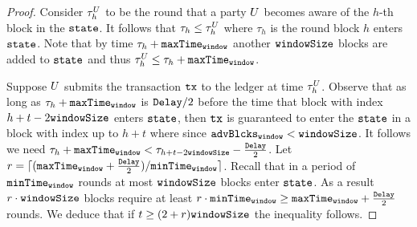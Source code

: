   \begin{proof}
    Consider $\tau^{U}_h$ to be the round that a party $U$  becomes
    aware of the $h$-th block in the $\texttt{state}$. It follows that $\tau_h \leq
    \tau^{U}_h$ where $\tau_h$ is the round block $h$ enters $\texttt{state}$. Note
    that by time $\tau_h + \texttt{maxTime}_\texttt{window}$ another $\texttt{windowSize}$ blocks are added to
    $\texttt{state}$ and thus $\tau^{U}_h \leq \tau_h + \texttt{maxTime}_\texttt{window}$.

    Suppose $U$ submits the transaction $\texttt{tx}$ to the ledger at time
    $\tau^{U}_h$. Observe that as long as $\tau_h + \texttt{maxTime}_\texttt{window}$ is $\texttt{Delay}/2$
    before the time that block with index $h + t - 2\texttt{windowSize}$ enters
    $\texttt{state}$, then $\texttt{tx}$ is guaranteed to enter the $\texttt{state}$ in a block with
    index up to $h + t$ where since $\texttt{advBlcks}_\texttt{window} < \texttt{windowSize}$. It
    follows we need $\tau_h + \texttt{maxTime}_\texttt{window} < \tau_{h + t - 2\texttt{windowSize}} -
    \frac{\texttt{Delay}}{2}$. Let $r = \lceil (\texttt{maxTime}_\texttt{window} + \frac{\texttt{Delay}}{2})/ \texttt{minTime}_\texttt{window}
    \rceil$. Recall that in a period of $\texttt{minTime}_\texttt{window}$ rounds at most $\texttt{windowSize}$
    blocks enter $\texttt{state}$. As a result $r \cdot \texttt{windowSize}$ blocks require at
    least $r \cdot \texttt{minTime}_\texttt{window} \geq \texttt{maxTime}_\texttt{window} + \frac{\texttt{Delay}}{2}$ rounds. We deduce
    that if $t \geq (2 + r)\texttt{windowSize}$ the inequality follows.
  \end{proof}

